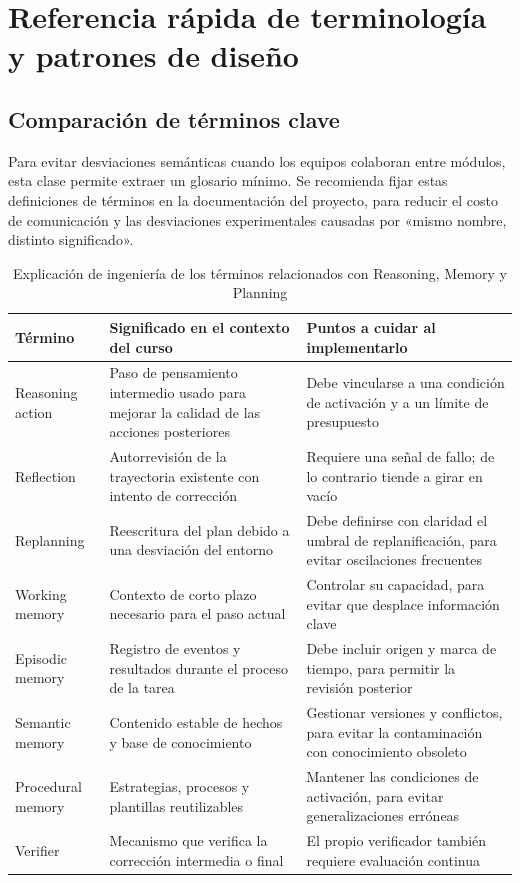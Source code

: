 \documentclass[a4paper]{article}
\begin{document}
\section{Referencia rápida de terminología y patrones de diseño}

\subsection{Comparación de términos clave}
Para evitar desviaciones semánticas cuando los equipos colaboran entre módulos, esta clase permite extraer un glosario mínimo. Se recomienda fijar estas definiciones de términos en la documentación del proyecto, para reducir el costo de comunicación y las desviaciones experimentales causadas por «mismo nombre, distinto significado».

\begin{table}[H]
\centering
\begin{tabular}{p{2.8cm}p{3.6cm}p{4.1cm}}
\toprule
\textbf{Término} & \textbf{Significado en el contexto del curso} & \textbf{Puntos a cuidar al implementarlo} \\
\midrule
Reasoning action & Paso de pensamiento intermedio usado para mejorar la calidad de las acciones posteriores & Debe vincularse a una condición de activación y a un límite de presupuesto \\
Reflection & Autorrevisión de la trayectoria existente con intento de corrección & Requiere una señal de fallo; de lo contrario tiende a girar en vacío \\
Replanning & Reescritura del plan debido a una desviación del entorno & Debe definirse con claridad el umbral de replanificación, para evitar oscilaciones frecuentes \\
Working memory & Contexto de corto plazo necesario para el paso actual & Controlar su capacidad, para evitar que desplace información clave \\
Episodic memory & Registro de eventos y resultados durante el proceso de la tarea & Debe incluir origen y marca de tiempo, para permitir la revisión posterior \\
Semantic memory & Contenido estable de hechos y base de conocimiento & Gestionar versiones y conflictos, para evitar la contaminación con conocimiento obsoleto \\
Procedural memory & Estrategias, procesos y plantillas reutilizables & Mantener las condiciones de activación, para evitar generalizaciones erróneas \\
Verifier & Mecanismo que verifica la corrección intermedia o final & El propio verificador también requiere evaluación continua \\
\bottomrule
\end{tabular}
\caption{Explicación de ingeniería de los términos relacionados con Reasoning, Memory y Planning}
\end{table}
\end{document}
